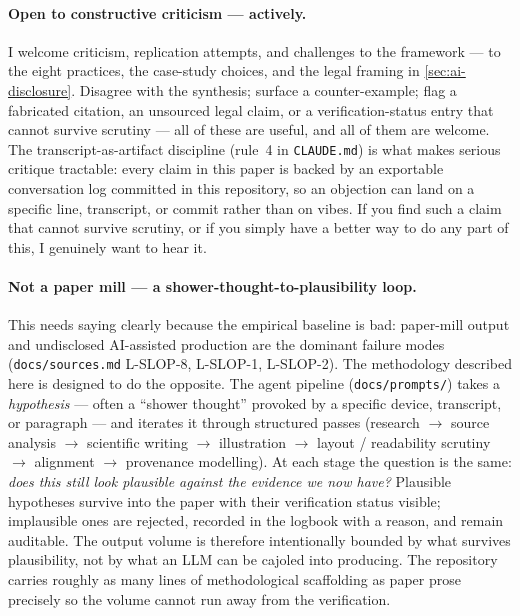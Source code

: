 \documentclass[11pt,a4paper]{article}
\begin{document}
\paragraph{Open to constructive criticism --- actively.}
I welcome criticism, replication attempts, and challenges to the
framework --- to the eight practices, the case-study choices, and the
legal framing in \cref{sec:ai-disclosure}. Disagree with the
synthesis; surface a counter-example; flag a fabricated citation, an
unsourced legal claim, or a verification-status entry that cannot
survive scrutiny --- all of these are useful, and all of them are
welcome. The transcript-as-artifact discipline (rule~4 in
\texttt{CLAUDE.md}) is what makes serious critique
tractable: every claim in this paper is backed by an exportable
conversation log committed in this repository, so an objection can
land on a specific line, transcript, or commit rather than on vibes.
If you find such a claim that cannot survive scrutiny, or if you simply
have a better way to do any part of this, I genuinely want to hear it.

\paragraph{Not a paper mill --- a shower-thought-to-plausibility loop.}
This needs saying clearly because the empirical baseline is bad:
paper-mill output and undisclosed AI-assisted production are the
dominant failure modes (\texttt{docs/sources.md} L-SLOP-8, L-SLOP-1,
L-SLOP-2). The methodology described here is designed to do the
opposite. The agent pipeline (\texttt{docs/prompts/}) takes a
\emph{hypothesis} --- often a ``shower thought'' provoked by a specific
device, transcript, or paragraph --- and iterates it through structured
passes (research $\rightarrow$ source analysis $\rightarrow$ scientific
writing $\rightarrow$ illustration $\rightarrow$ layout / readability
scrutiny $\rightarrow$ alignment $\rightarrow$ provenance modelling).
At each stage the question is the same:
\emph{does this still look plausible against the evidence we now have?}
Plausible hypotheses survive into the paper with their verification
status visible; implausible ones are rejected, recorded in the logbook
with a reason, and remain auditable. The output volume is therefore
intentionally bounded by what survives plausibility, not by what an
LLM can be cajoled into producing. The repository carries roughly as
many lines of methodological scaffolding as paper prose precisely so
the volume cannot run away from the verification.
\end{document}
